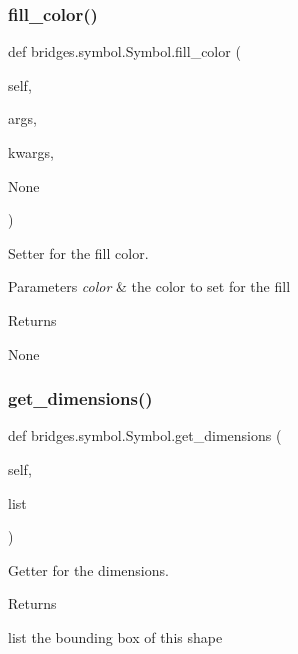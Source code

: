 \subsubsection{\texorpdfstring{fill\+\_\+color()}{fill\_color()}\hspace{0.1cm}{\footnotesize\ttfamily [2/2]}}
{\footnotesize\ttfamily def bridges.\+symbol.\+Symbol.\+fill\+\_\+color (\begin{DoxyParamCaption}\item[{}]{self,  }\item[{}]{args,  }\item[{}]{kwargs,  }\item[{}]{None }\end{DoxyParamCaption})}



Setter for the fill color. 


\begin{DoxyParams}{Parameters}
{\em color} & the color to set for the fill \\
\hline
\end{DoxyParams}
\begin{DoxyReturn}{Returns}


None 
\end{DoxyReturn}
\mbox{\label{classbridges_1_1symbol_1_1_symbol_ae53057317f11148bbbf7c17c671cac2d}} 
\subsubsection{\texorpdfstring{get\+\_\+dimensions()}{get\_dimensions()}}
{\footnotesize\ttfamily def bridges.\+symbol.\+Symbol.\+get\+\_\+dimensions (\begin{DoxyParamCaption}\item[{}]{self,  }\item[{}]{list }\end{DoxyParamCaption})}



Getter for the dimensions. 

\begin{DoxyReturn}{Returns}


list the bounding box of this shape 
\end{DoxyReturn}
\mbox{\label{classbridges_1_1symbol_1_1_symbol_a746f8e6d1fd1c63c8a9140a2af7436f8}} 
